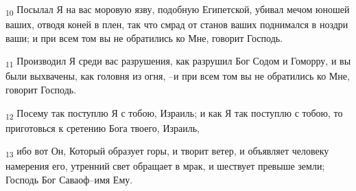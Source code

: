 \begin{tcolorbox}
\textsubscript{10} Посылал Я на вас моровую язву, подобную Египетской, убивал мечом юношей ваших, отводя коней в плен, так что смрад от станов ваших поднимался в ноздри ваши; и при всем том вы не обратились ко Мне, говорит Господь.
\end{tcolorbox}
\begin{tcolorbox}
\textsubscript{11} Производил Я среди вас разрушения, как разрушил Бог Содом и Гоморру, и вы были выхвачены, как головня из огня, --и при всем том вы не обратились ко Мне, говорит Господь.
\end{tcolorbox}
\begin{tcolorbox}
\textsubscript{12} Посему так поступлю Я с тобою, Израиль; и как Я так поступлю с тобою, то приготовься к сретению Бога твоего, Израиль,
\end{tcolorbox}
\begin{tcolorbox}
\textsubscript{13} ибо вот Он, Который образует горы, и творит ветер, и объявляет человеку намерения его, утренний свет обращает в мрак, и шествует превыше земли; Господь Бог Саваоф--имя Ему.
\end{tcolorbox}
